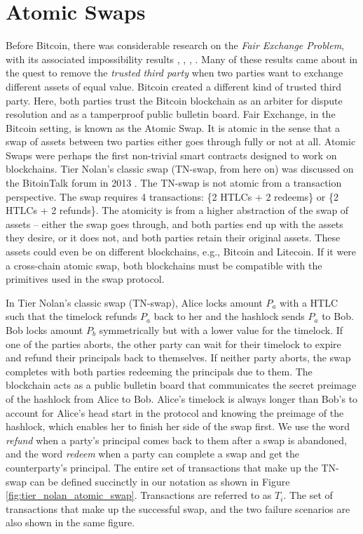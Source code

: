 \section{Atomic Swaps}
\label{chap:background:atomic_swaps}
Before Bitcoin, there was considerable research on the \textit{Fair Exchange Problem}, with its associated impossibility results \cite{cleve1986limits}, \cite{fair_exchange_impossibility}, \cite{franklin1997fair}, \cite{asokan1998optimistic}. Many of these results came about in the quest to remove the \textit{trusted third party} when two parties want to exchange different assets of equal value. Bitcoin created a different kind of trusted third party. Here, both parties trust the Bitcoin blockchain as an arbiter for dispute resolution and as a tamperproof public bulletin board. Fair Exchange, in the Bitcoin setting, is known as the Atomic Swap. It is atomic in the sense that a swap of assets between two parties either goes through fully or not at all. Atomic Swaps were perhaps the first non-trivial smart contracts designed to work on blockchains. Tier Nolan's classic swap (TN-swap, from here on) was discussed on the BitoinTalk forum in 2013 \cite{atomic_swap}. The TN-swap is not atomic from a transaction perspective. The swap requires 4 transactions: \{2 HTLCs + 2 redeems\} or \{2 HTLCs + 2 refunds\}. The atomicity is from a higher abstraction of the swap of assets -- either the swap goes through, and both parties end up with the assets they desire, or it does not, and both parties retain their original assets. These assets could even be on different blockchains, e.g., Bitcoin and Litecoin. If it were a cross-chain atomic swap, both blockchains must be compatible with the primitives used in the swap protocol. 

In Tier Nolan's classic swap (TN-swap), Alice locks amount $P_a$ with a HTLC such that the timelock refunds $P_a$ back to her and the hashlock sends $P_a$ to Bob. Bob locks amount $P_b$ symmetrically but with a lower value for the timelock. If one of the parties aborts, the other party can wait for their timelock to expire and refund their principals back to themselves. If neither party aborts, the swap completes with both parties redeeming the principals due to them. The blockchain acts as a public bulletin board that communicates the secret preimage of the hashlock from Alice to Bob. Alice's timelock is always longer than Bob's to account for Alice's head start in the protocol and knowing the preimage of the hashlock, which enables her to finish her side of the swap first. We use the word \textit{refund} when a party's principal comes back to them after a swap is abandoned, and the word \textit{redeem} when a party can complete a swap and get the counterparty's principal. The entire set of transactions that make up the TN-swap can be defined succinctly in our notation as shown in Figure \ref{fig:tier_nolan_atomic_swap}. Transactions are referred to as $T_i$. The set of transactions that make up the successful swap, and the two failure scenarios are also shown in the same figure.

